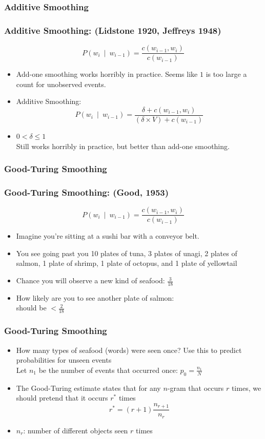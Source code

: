 \subsubsection{Additive Smoothing}

\begin{frame}
\frametitle{Additive Smoothing: (Lidstone 1920, Jeffreys 1948)} 
\[ P(w_i~\mid~w_{i-1}) = \frac{ c(w_{i-1},w_i) } { c(w_{i-1}) } \]
\begin{itemize}[<+->]
\item Add-one smoothing works horribly in practice. Seems like $1$ is too large a count for unobserved events.
\item Additive Smoothing:
\[ P(w_i~\mid~w_{i-1}) = \frac{ \delta + c(w_{i-1},w_i) } { (\delta \times V) + c(w_{i-1}) } \]
\item $0 < \delta \leq 1$ \\
Still works horribly in practice, but better than add-one smoothing.
\end{itemize}
\end{frame}

\subsubsection{Good-Turing Smoothing}

\begin{frame}
\frametitle{Good-Turing Smoothing: (Good, 1953)} 
\[ P(w_i~\mid~w_{i-1}) = \frac{ c(w_{i-1},w_i) } { c(w_{i-1}) } \]
\begin{itemize}[<+->]
\item Imagine you're sitting at a sushi bar with a conveyor belt. 
\item You see going past you  { \color{blue} 10} plates of tuna,  { \color{blue} 3} plates of unagi,  { \color{blue} 2} plates of salmon,  { \color{blue} 1} plate of shrimp,  { \color{blue} 1} plate of octopus, and  { \color{blue} 1} plate of yellowtail
\item Chance you will observe a \alert{new} kind of seafood: {\color{blue} $\frac{3}{18}$}
\item How likely are you to see another plate of salmon: \\
should be { \color{blue} $< \frac{2}{18}$ }
\end{itemize}
\end{frame}

\begin{frame}
\frametitle{Good-Turing Smoothing}
\begin{itemize}[<+->]
\item How many types of seafood (words) were seen once? Use this to predict probabilities for unseen events\\
Let $n_1$ be the number of events that occurred once: 
{ \color{blue} $p_0 = \frac{ n_1 }{ N } $}
\item The Good-Turing estimate states that for any $n$-gram that occurs $r$ times, we should pretend that it occurs $r^\ast$ times
{\color{blue} \[ r^\ast = (r+1) \frac{ n_{r+1} }{ n_r } \] }
\item {\color{blue} $n_r$}: number of different objects seen $r$ times
\end{itemize}
\end{frame}

